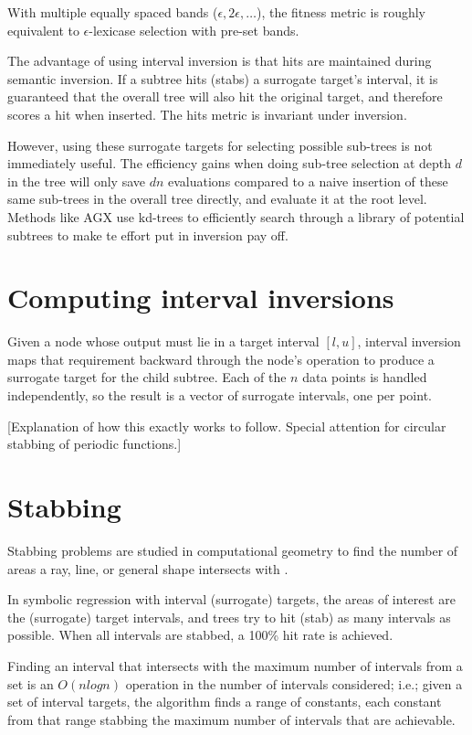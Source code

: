 \documentclass{llncs}
\begin{document}
With multiple equally spaced bands ($\epsilon, 2\epsilon, \ldots$), the fitness metric is roughly equivalent to $\epsilon$-lexicase selection \cite{eps-lexicase} with pre-set bands. 

The advantage of using interval inversion is that hits are maintained during semantic inversion. If a subtree hits (stabs) a surrogate target's interval, it is guaranteed that the overall tree will also hit the original target, and therefore scores a hit when inserted. The hits metric is invariant under inversion. 

However, using these surrogate targets for selecting possible sub-trees is not immediately useful. The efficiency gains when doing sub-tree selection at depth $d$ in the tree will only save $d n$ evaluations compared to a naive insertion of these same sub-trees in the overall tree directly, and evaluate it at the root level. Methods like AGX \cite{krawiec} use kd-trees to efficiently search through a library of potential subtrees to make te effort put in inversion pay off. 

\section{Computing interval inversions}

Given a node whose output must lie in a target interval $[l, u]$, interval inversion maps that requirement backward through the node's operation to produce a surrogate target for the child subtree. Each of the $n$ data points is handled independently, so the result is a vector of surrogate intervals, one per point.

[Explanation of how this exactly works to follow. Special attention for circular stabbing of periodic functions.]

\section{Stabbing}

Stabbing problems are studied in computational geometry to find the number of areas a ray, line, or general shape intersects with \cite{geometry}. 

In symbolic regression with interval (surrogate) targets, the areas of interest are the (surrogate) target intervals, and trees try to hit (stab) as many intervals as possible. When all intervals are stabbed, a 100\% hit rate is achieved.

Finding an interval that intersects with the maximum number of intervals from a set is an $O(n log n)$ operation in the number of intervals considered; i.e.; given a set of interval targets, the algorithm finds a range of constants, each constant from that range stabbing the maximum number of intervals that are achievable.
\end{document}
